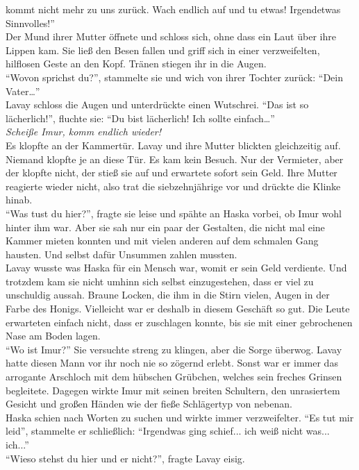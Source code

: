 kommt nicht mehr zu uns zurück. Wach endlich auf und tu etwas! Irgendetwas Sinnvolles!''\\
Der Mund ihrer Mutter öffnete und schloss sich, ohne dass ein Laut über ihre Lippen kam. Sie ließ 
den Besen fallen und griff sich in einer verzweifelten, hilflosen Geste an den Kopf. Tränen stiegen 
ihr in die Augen. \\
``Wovon sprichst du?'', stammelte sie und wich von ihrer Tochter zurück: ``Dein Vater…''\\
Lavay schloss die Augen und unterdrückte einen Wutschrei. ``Das ist so lächerlich!'', fluchte sie: 
``Du bist lächerlich! Ich sollte einfach…''\\
\textit{Scheiße Imur, komm endlich wieder!}\\
Es klopfte an der Kammertür. Lavay und ihre Mutter blickten gleichzeitig auf. Niemand klopfte je an 
diese Tür. Es kam kein Besuch. Nur der Vermieter, aber der klopfte nicht, der stieß sie auf und 
erwartete sofort sein Geld. Ihre Mutter reagierte wieder nicht, also trat die siebzehnjährige vor 
und drückte die Klinke hinab. \\
``Was tust du hier?'', fragte sie leise und spähte an Haska vorbei, ob Imur wohl hinter ihm war. 
Aber sie sah nur ein paar der Gestalten, die nicht mal eine Kammer mieten konnten und mit vielen 
anderen auf dem schmalen Gang hausten. Und selbst dafür Unsummen zahlen mussten. \\
Lavay wusste was Haska für ein Mensch war, womit er sein Geld verdiente. Und trotzdem kam sie nicht 
umhinn sich selbst einzugestehen, dass er viel zu unschuldig aussah. Braune Locken, die ihm in die 
Stirn vielen, Augen in der Farbe des Honigs. Vielleicht war er deshalb in diesem Geschäft so gut. 
Die Leute erwarteten einfach nicht, dass er zuschlagen konnte, bis sie mit einer gebrochenen Nase 
am Boden lagen. \\
``Wo ist Imur?'' Sie versuchte streng zu klingen, aber die Sorge überwog. Lavay hatte diesen Mann 
vor ihr noch nie so zögernd erlebt. Sonst war er immer das arrogante Arschloch mit dem hübschen 
Grübchen, welches sein freches Grinsen begleitete. Dagegen wirkte Imur mit seinen breiten 
Schultern, den unrasiertem Gesicht und großen Händen wie der fieße Schlägertyp von nebenan. \\
Haska schien nach Worten zu suchen und wirkte immer verzweifelter. ``Es tut mir leid'', stammelte 
er schließlich: ``Irgendwas ging schief... ich weiß nicht was... ich...''\\
``Wieso stehst du hier und er nicht?'', fragte Lavay eisig.\\
